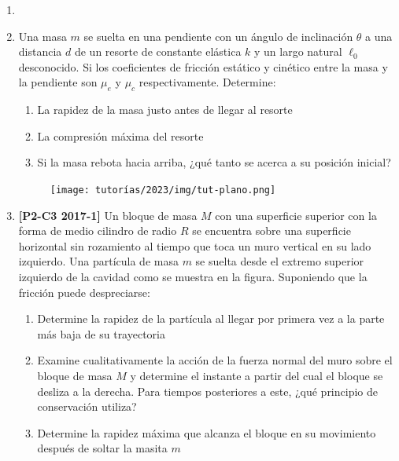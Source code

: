 \documentclass[letterpaper,11pt]{article}
\begin{document}
\vspace{-1cm}
\begin{enumerate}\setlength{\itemsep}{0.4cm}

\item[]

\item 
\begin{multicols}{2}
Una masa $m$ se suelta en una pendiente con un ángulo de inclinación $\theta$ a una distancia $d$ de un resorte de constante elástica $k$ y un largo natural $\ell_0$ desconocido. Si los coeficientes de fricción estático y cinético entre la masa y la pendiente son $\mu_e$ y $\mu_c$ respectivamente. Determine:
    \begin{enumerate}
        \item La rapidez de la masa justo antes de llegar al resorte

        \item La compresión máxima del resorte

        \item Si la masa rebota hacia arriba, ¿qué tanto se acerca a su posición inicial?
    \end{enumerate}

\columnbreak
\begin{figure}[H]
    \centering
    \texttt{[image: tutorías/2023/img/tut-plano.png]}
\end{figure}
\end{multicols}

\item \textbf{[P2-C3 2017-1]} Un bloque de masa $M$ con una superficie superior con la forma de medio cilindro de radio $R$ se encuentra sobre una superficie horizontal sin rozamiento al tiempo que toca un muro vertical en su lado izquierdo. Una partícula de masa $m$ se suelta desde el extremo superior izquierdo de la cavidad como se muestra en la figura. Suponiendo que la fricción puede despreciarse:
\begin{enumerate}
    \item Determine la rapidez de la partícula al llegar por primera vez a la parte más baja de su trayectoria
    
    \item Examine cualitativamente la acción de la fuerza normal del muro sobre el bloque de masa $M$ y determine el instante a partir del cual el bloque se desliza a la derecha. Para tiempos posteriores a este, ¿qué principio de conservación utiliza?
    
    \item Determine la rapidez máxima que alcanza el bloque en su movimiento después de soltar la masita $m$
\end{enumerate}



\end{enumerate}
\end{document}

